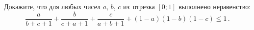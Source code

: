 \begin{problems}
\item
Докажите, что для любых чисел $a$, $b$, $c$ из~отрезка $[0; 1]$ выполнено
неравенство:
\[
    \frac{a}{b + c + 1} + \frac{b}{c + a + 1} + \frac{c}{a + b + 1} +
    (1 - a) (1 - b) (1 - c)
\leq
    1
\, . \]





\end{problems}


